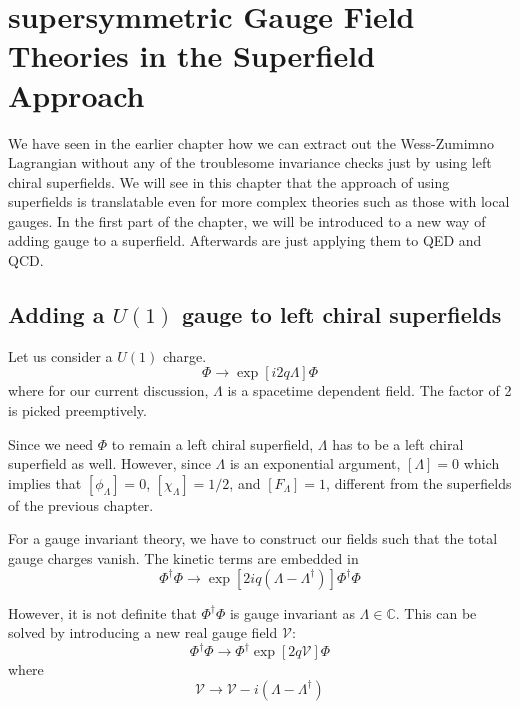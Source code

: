 \chapter{supersymmetric Gauge Field Theories in the Superfield Approach}
\label{ch:13}
We have seen in the earlier chapter how we can extract out the Wess-Zumimno Lagrangian without any of the troublesome invariance checks just by using left chiral superfields. We will see in this chapter that the approach of using superfields is translatable even for more complex theories such as those with local gauges. In the first part of the chapter, we will be introduced to a new way of adding gauge to a superfield. Afterwards are just applying them to QED and QCD.

\section{Adding a $U(1)$ gauge to left chiral superfields}
\label{ch:13:adding gauge to eft chiral superfields}
Let us consider a $U(1)$ charge. 
\begin{equation}
    \Phi \rightarrow \exp[i 2 q \Lambda] \Phi
\end{equation}
where for our current discussion, $\Lambda$ is a spacetime dependent field. The factor of 2 is picked preemptively.

Since we need $\Phi$ to remain a left chiral superfield, $\Lambda$ has to be a left chiral superfield as well. However, since $\Lambda$ is an exponential argument, $[\Lambda] = 0$ which implies that $[\phi_\Lambda] = 0$, $[\chi_\Lambda] = 1/2$, and $[F_\Lambda] = 1$, different from the superfields of the previous chapter.

For a gauge invariant theory, we have to construct our fields such that the total gauge charges vanish. The kinetic terms are embedded in
\begin{equation}
    \Phi^\dagger \Phi \rightarrow \exp[2iq(\Lambda - \Lambda^\dagger)]\Phi^\dagger\Phi
\end{equation}

However, it is not definite that $\Phi^\dagger \Phi$ is gauge invariant as $\Lambda \in \mathbb{C}$. This can be solved by introducing a new real gauge field $\mathcal{V}$:
\begin{equation}
    \Phi^\dagger \Phi \rightarrow \Phi^\dagger \exp[2q\mathcal{V}] \Phi
\end{equation}
where
\begin{equation}
    \mathcal{V} \rightarrow \mathcal{V} - i (\Lambda - \Lambda^\dagger)
\end{equation}

